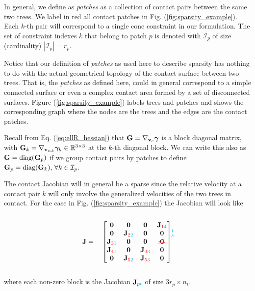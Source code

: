 In general, we define as \textit{patches} as a collection of contact pairs
between the same two trees. We label in red all contact patches in Fig.
(\ref{fig:sparsity_example}). Each $k\text{-th}$ pair will correspond to a
single cone constraint in our formulation. The set of constraint indexes
$k$ that belong to patch $p$ is denoted with $\mathcal{I}_p$ of size
(cardinality) $|\mathcal{I}_p| = r_p$.

Notice that our definition of \textit{patches} as used here to describe sparsity
has nothing to do with the actual geometrical topology of the contact surface
between two trees. That is, the \textit{patches} as defined here, could in
general correspond to a simple connected surface or even a complex contact area
formed by a set of disconnected surfaces. Figure (\ref{fig:sparsity_example})
labels trees and patches and shows the corresponding graph where the nodes are
the trees and the edges are the contact patches.

Recall from Eq. (\ref{eq:ellR_hessian}) that ${\mathbf{G}} = \nabla_{{\mathbf{v}}_c}{\bm\gamma}$
is a block diagonal matrix, with ${\mathbf{G}}_k = \nabla_{{\mathbf{v}}_{c,k}}{\bm\gamma}_k \in
\mathbb{R}^{3\times 3}$ at the $k\text{-th}$ diagonal block. We can write this
also as ${\mathbf{G}} = \text{diag}({\mathbf{G}}_p)$ if we group contact pairs by patches to
define ${\mathbf{G}}_p=\text{diag}({\mathbf{G}}_k), \,\forall k\in\mathcal{I}_p$.

The contact Jacobian will in general be a sparse since the relative velocity at
a contact pair $k$ will only involve the generalized velocities of the two trees
in contact. For the case in Fig. (\ref{fig:sparsity_example}) the Jacobian will
look like\\\\
\begin{equation}
	\mf{J}=\quad
	\begin{bmatrix}
		\tikzmark{J_topleft}\mf{0} & 
		\mf{0} & \mf{0} & \mf{J}_{\rr{1}\cc{4}}\tikzmark{J_topright}\\		
		\mf{0} & \mf{J}_{\rr{2}\cc{2}} & \mf{0} & \mf{0}\\
		\mf{J}_{\rr{3}\cc{1}} & \mf{0} & \mf{0} & \mf{0}\\
		\mf{J}_{\rr{4}\cc{1}} & \mf{0} & \mf{J}_{\rr{4}\cc{3}} & \mf{0}\\
		\tikzmark{J_bottomleft}
		\mf{0} & \mf{J}_{\rr{5}\cc{2}} & \mf{J}_{\rr{5}\cc{3}} & \mf{0}		
	\end{bmatrix}
\tikz[overlay,remember picture] {
	\draw[->,thick,color=cyan]
  ([yshift=3ex]J_topleft) -- ([yshift=3ex]J_topright) node[midway,above]
  {\scriptsize $t$}; 
  \draw[->,thick,color=red]
  ([yshift=1.5ex,xshift=-3ex]J_topleft) -- ([xshift=-3ex]J_bottomleft)
  node[near end,left] {\scriptsize $p$};}	
\end{equation}
\\
where each non-zero block is the Jacobian ${\mathbf{J}}_{{\color{red}p}{\color{cyan}t}}$ of size
$3r_p\times n_t$.

